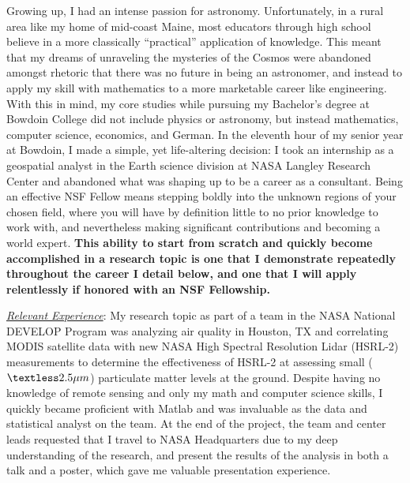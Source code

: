 Growing up, I had an  intense passion for astronomy. Unfortunately, in
a rural area  like my home of mid-coast Maine,  most educators through
high school believe  in a more classically  “practical” application of
knowledge. This  meant that my  dreams of unraveling the  mysteries of
the Cosmos were abandoned amongst rhetoric that there was no future in
being an astronomer, and instead to apply my skill with mathematics to
a more marketable career like engineering.  With this in mind, my core
studies while pursuing my Bachelor’s degree at Bowdoin College did not
include  physics  or  astronomy,  but  instead  mathematics,  computer
science, economics, and German. In the eleventh hour of my senior year
at Bowdoin,  I made a  simple, yet  life-altering decision: I  took an
internship as  a geospatial analyst  in the Earth science  division at
NASA Langley Research Center and abandoned what was shaping up to be a
career as a consultant.  Being  an effective NSF Fellow means stepping
boldly into the  unknown regions of your chosen field,  where you will
have by  definition little  to no  prior knowledge  to work  with, and
nevertheless  making significant  contributions and  becoming a  world
expert.   \textbf{This  ability  to  start from  scratch  and  quickly  become
accomplished in a research topic  is one that I demonstrate repeatedly
throughout  the career  I  detail below,  and one  that  I will  apply
relentlessly if honored with an NSF Fellowship.}


\underline{\textit{Relevant Experience}}:
My research topic as part of a team in the NASA National DEVELOP
Program was analyzing air quality in Houston, TX and correlating MODIS
satellite data with new NASA High Spectral Resolution Lidar (HSRL-2)
measurements to determine the effectiveness of HSRL-2 at assessing
small ($\textless2.5\mu m$) particulate matter levels at the
ground. Despite having no knowledge of remote sensing and only my math
and computer science skills, I quickly became proficient with Matlab
and was invaluable as the data and statistical analyst on the team.
At the end of the project, the team and center leads requested that I
travel to NASA Headquarters due to my deep understanding of the
research, and present the results of the analysis in both a talk and a
poster, which gave me valuable presentation experience.

